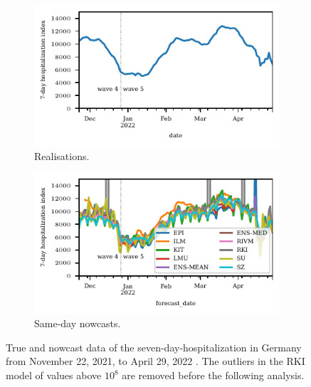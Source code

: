 \begin{figure}
    \centering
    \begin{subfigure}[t]{0.48\textwidth}
    \includegraphics{plots/covid_nowcast/00_true_data.pdf}
    \caption{Realisations.}
    \label{fig:app-covid-true}
    \end{subfigure}\hfill
    \begin{subfigure}[t]{0.48\textwidth}
    \includegraphics{plots/covid_nowcast/00_nowcast_data.pdf}
    \caption{Same-day nowcasts. }
    \label{fig:app-covid-nowcast}
        \end{subfigure}
    \caption{True and nowcast data of the seven-day-hospitalization in Germany from November 22, 2021, to April 29, 2022 \parencite{ChairOfEconometricsAndStatisticsAtKarlsruheInstituteOfTechnology2024}.
    The outliers in the RKI model of values above $10^8$ are removed before the following analysis.}
    \label{fig:app-covid-true-nowcast}
\end{figure}

